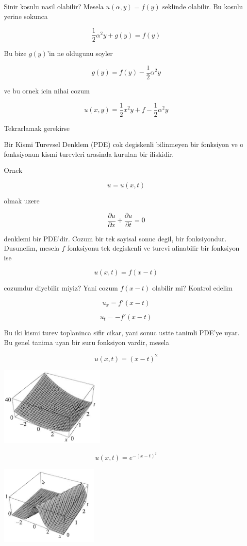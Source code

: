 \documentclass[12pt,fleqn]{article}\usepackage{../common}
\begin{document}
Sinir kosulu nasil olabilir? Mesela $u(\alpha,y) = f(y)$ seklinde
olabilir. Bu kosulu yerine sokunca

\[ \frac{1}{2}\alpha^2 y + g(y) = f(y) \]

Bu bize $g(y)$'in ne oldugunu soyler

\[ g(y)  = f(y) - \frac{1}{2}\alpha^2 y \]

ve bu ornek icin nihai cozum

\[ u(x,y) = \frac{1}{2}x^2y + f - \frac{1}{2}\alpha^2 y \]

Tekrarlamak gerekirse

Bir Kismi Turevsel Denklem (PDE) cok degiskenli bilinmeyen bir fonksiyon ve
o fonksiyonun kismi turevleri arasinda kurulan bir iliskidir. 

Ornek 

\[ u = u(x,t) \]

olmak uzere

\[ \frac{\partial u}{\partial x} + \frac{\partial u}{\partial t} = 0\]

denklemi bir PDE'dir. Cozum bir tek sayisal sonuc degil, bir
fonksiyondur. Dusunelim, mesela $f$ fonksiyonu tek degiskenli ve turevi
alinabilir bir fonksiyon ise

\[ u(x,t) = f(x-t) \]

cozumdur diyebilir miyiz? Yani cozum $f(x-t)$ olabilir mi? Kontrol edelim 

\[ u_x = f'(x-t) \]

\[ u_t = -f'(x-t) \]

Bu iki kismi turev toplaninca sifir cikar, yani sonuc ustte tanimli PDE'ye
uyar. Bu genel tanima uyan bir suru fonksiyon vardir, mesela 

\[ u(x,t) = (x-t)^2 \]

\includegraphics[height=4cm]{1_1.png}

\[ u(x,t) = e^{-(x-t)^2} \]

\includegraphics[height=4cm]{1_2.png}
\end{document}
